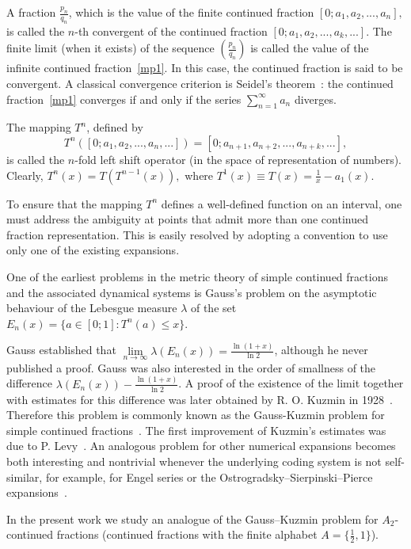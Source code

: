 \documentclass[11pt]{amsart}
\theoremstyle{plain}
\theoremstyle{remark}
\begin{document}
A fraction $\frac{p_n}{q_n}$, which is the value of the finite continued fraction $[0;a_{1},a_{2},...,a_{n}],$ is called the $n$-th convergent of the continued fraction $[0;a_{1},a_{2},...,a_{k},...]$. The finite limit (when it exists) of the sequence $(\frac{p_n}{q_n})$ is called the value of the infinite continued fraction~\eqref{mp1}. In this case, the continued fraction is said to be convergent. A classical convergence criterion is Seidel's theorem~\cite{seid}: the continued fraction~\eqref{mp1} converges if and only if the series
$\sum\limits_{n=1}^{\infty}a_n$ diverges.

The mapping $T^n$, defined by
\begin{equation}\label{oper}
T^n([0;a_{1}, a_{2}, ..., a_{n}, ...])=[0;a_{n+1}, a_{n+2},...,a_{n+k}, ...],
\end{equation}
is called the $n$-fold left shift operator (in the space of representation of numbers). Clearly, \(T^n(x)=T(T^{n-1}(x)),\)
where $T^1(x)\equiv T(x)=\frac{1}{x}-a_1(x)$.

To ensure that the mapping $T^n$ defines a well-defined function on an interval, one must address the ambiguity at points that admit more than one continued fraction representation. This is easily resolved by adopting a convention to use only one of the existing expansions.
 
One of the earliest problems in the metric theory of simple continued fractions and the associated dynamical systems is Gauss's problem on the asymptotic behaviour of the Lebesgue measure $\lambda$ of the set $E_n(x)=\{a\in [0;1]: T^n(a)\leq x\}$.

Gauss established that $\lim\limits_{n\to\infty}\lambda (E_n(x))=\frac{\ln(1+x)}{\ln2}$, although he never published a proof. Gauss was also interested in the order of smallness of the difference $\lambda(E_n(x))-\frac{\ln(1+x)}{\ln2}$. A proof of the existence of the limit together with estimates for this difference was later obtained by R. O. Kuzmin in 1928~\cite{kuz2}. Therefore this problem is commonly known as the Gauss-Kuzmin problem for simple continued fractions~\cite{chin}. The first improvement of Kuzmin's estimates was due to P. Levy~\cite{lev}.
An analogous problem for other numerical expansions becomes both interesting and nontrivial whenever the underlying coding system is not self-similar, for example, for Engel series or the Ostrogradsky--Sierpinski--Pierce expansions~\cite{M_2023}.

In the present work we study an analogue of the Gauss--Kuzmin problem for $A_2$-continued fractions (continued fractions with the finite alphabet $A=\{\frac{1}{2},1\}$).
\end{document}
